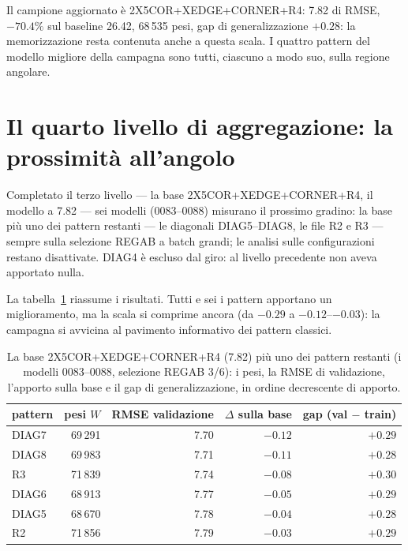 Il campione aggiornato è 2X5COR+XEDGE+CORNER+R4: 7.82 di RMSE,
$-70.4\%$ sul baseline 26.42, 68\,535 pesi, gap di
generalizzazione $+0.28$: la memorizzazione resta contenuta anche a
questa scala. I quattro pattern del modello migliore della campagna
sono tutti, ciascuno a modo suo, sulla regione angolare.

\section{Il quarto livello di aggregazione: la prossimità
all'angolo}

Completato il terzo livello — la base 2X5COR+XEDGE+CORNER+R4, il
modello a 7.82 — sei modelli (0083--0088) misurano il prossimo
gradino: la base più uno dei pattern restanti — le diagonali
DIAG5--DIAG8, le file R2 e R3 — sempre sulla selezione REGAB a
batch grandi; le analisi sulle configurazioni restano
disattivate. DIAG4 è escluso dal giro: al livello precedente non
aveva apportato nulla.

La tabella~\ref{tab:feature-base-pattern-quarto-livello} riassume i
risultati. Tutti e sei i pattern apportano un miglioramento, ma la
scala si comprime ancora (da $-0.29$ a $-0.12$--$-0.03$): la
campagna si avvicina al pavimento informativo dei pattern
classici.

\begin{table}[ht]
\centering
\begin{tabular}{lrrrr}
\toprule
pattern & pesi $W$ & RMSE validazione & $\Delta$ sulla base & gap (val $-$ train) \\
\midrule
DIAG7  & 69\,291 & 7.70 & $-0.12$ & $+0.29$ \\
DIAG8  & 69\,983 & 7.71 & $-0.11$ & $+0.28$ \\
R3     & 71\,839 & 7.74 & $-0.08$ & $+0.30$ \\
DIAG6  & 68\,913 & 7.77 & $-0.05$ & $+0.29$ \\
DIAG5  & 68\,670 & 7.78 & $-0.04$ & $+0.28$ \\
R2     & 71\,856 & 7.79 & $-0.03$ & $+0.29$ \\
\bottomrule
\end{tabular}
\caption{La base 2X5COR+XEDGE+CORNER+R4 (7.82) più uno dei pattern
restanti (i modelli 0083--0088, selezione REGAB 3/6): i pesi, la
RMSE di validazione, l'apporto sulla base e il gap di
generalizzazione, in ordine decrescente di apporto.}
\label{tab:feature-base-pattern-quarto-livello}
\end{table}

